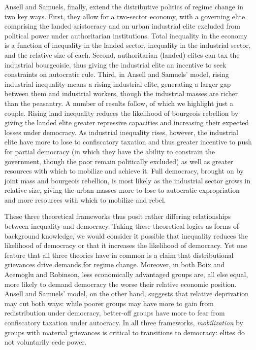 \documentclass[12pt,]{book}
\begin{document}
Ansell and Samuels, finally, extend the distributive politics of regime change in two key ways. First, they allow for a two-sector economy, with a governing elite comprising the landed aristocracy and an urban industrial elite excluded from political power under authoritarian institutions. Total inequality in the economy is a function of inequality in the landed sector, inequality in the industrial sector, and the relative size of each. Second, authoritarian (landed) elites can tax the industrial bourgeoisie, thus giving the industrial elite an incentive to seek constraints on autocratic rule. Third, in Ansell and Samuels' model, rising industrial inequality means a rising industrial elite, generating a larger gap between them and industrial workers, though the industrial masses are richer than the peasantry. A number of results follow, of which we highlight just a couple. Rising land inequality reduces the likelihood of bourgeois rebellion by giving the landed elite greater repressive capacities and increasing their expected losses under democracy. As industrial inequality rises, however, the industrial elite have more to lose to confiscatory taxation and thus greater incentive to push for partial democracy (in which they have the ability to constrain the government, though the poor remain politically excluded) as well as greater resources with which to mobilize and achieve it. Full democracy, brought on by joint mass and bourgeois rebellion, is most likely as the industrial sector grows in relative size, giving the urban masses more to lose to autocratic expropriation and more resources with which to mobilize and rebel.

These three theoretical frameworks thus posit rather differing relationships between inequality and democracy. Taking these theoretical logics as forms of background knowledge, we would consider it possible that inequality reduces the likelihood of democracy or that it increases the likelihood of democracy. Yet one feature that all three theories have in common is a claim that distributional grievances drive demands for regime change. Moreover, in both Boix and Acemoglu and Robinson, less economically advantaged groups are, all else equal, more likely to demand democracy the worse their relative economic position. Ansell and Samuels' model, on the other hand, suggests that relative deprivation may cut both ways: while poorer groups may have more to gain from redistribution under democracy, better-off groups have more to fear from confiscatory taxation under autocracy. In all three frameworks, \emph{mobilization} by groups with material grievances is critical to transitions to democracy: elites do not voluntarily cede power.
\end{document}
